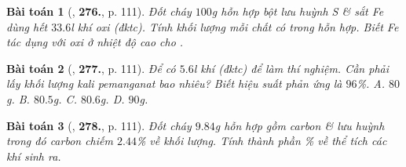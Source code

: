 \documentclass{article}
\numberwithin{equation}{section}
\newtheorem{baitoan}{Bài toán}
\begin{document}
\begin{baitoan}[\cite{An_400_BT_Hoa_Hoc_8_2020}, \textbf{276.}, p. 111]
	Đốt cháy $100$\emph{g} hỗn hợp bột lưu huỳnh \emph{S} \& sắt \emph{Fe} dùng hết $33.6$\emph{l} khí oxi (đktc). Tính khối lượng mỗi chất có trong hỗn hợp. Biết \emph{Fe} tác dụng với oxi ở nhiệt độ cao cho \emph{}.
\end{baitoan}

\begin{baitoan}[\cite{An_400_BT_Hoa_Hoc_8_2020}, \textbf{277.}, p. 111]
	Để có $5.6$\emph{l} khí \emph{} (đktc) để làm thí nghiệm. Cần phải lấy khối lượng kali pemanganat \emph{} bao nhiêu? Biết hiệu suất phản ứng là $96$\%. {\sf A.} $80$\emph{g}. {\sf B.} $80.5$\emph{g}. {\sf C.} $80.6$\emph{g}. {\sf D.} $90$\emph{g}.
\end{baitoan}

\begin{baitoan}[\cite{An_400_BT_Hoa_Hoc_8_2020}, \textbf{278.}, p. 111]
	Đốt cháy $9.84$\emph{g} hỗn hợp gồm carbon \& lưu huỳnh trong đó carbon chiếm $2.44$\% về khối lượng. Tính thành phần \% về thể tích các khí sinh ra.
\end{baitoan}


\printbibliography[heading=bibintoc]
	
\end{document}
